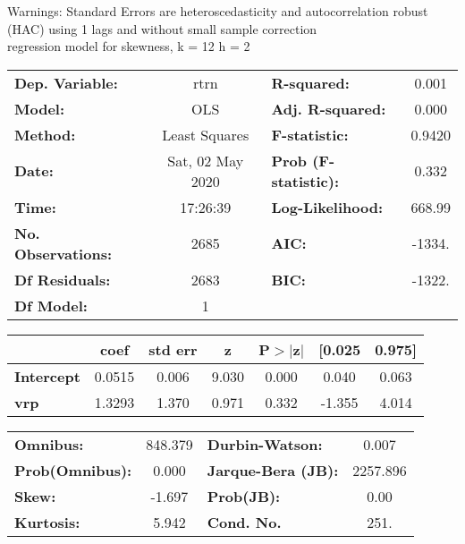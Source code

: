 Warnings: \newline
 [1] Standard Errors are heteroscedasticity and autocorrelation robust (HAC) using 1 lags and without small sample correction\\ 

regression model for skewness, k = 12 h = 2\begin{center}
\begin{tabular}{lclc}
\toprule
\textbf{Dep. Variable:}    &       rtrn       & \textbf{  R-squared:         } &     0.001   \\
\textbf{Model:}            &       OLS        & \textbf{  Adj. R-squared:    } &     0.000   \\
\textbf{Method:}           &  Least Squares   & \textbf{  F-statistic:       } &    0.9420   \\
\textbf{Date:}             & Sat, 02 May 2020 & \textbf{  Prob (F-statistic):} &    0.332    \\
\textbf{Time:}             &     17:26:39     & \textbf{  Log-Likelihood:    } &    668.99   \\
\textbf{No. Observations:} &        2685      & \textbf{  AIC:               } &    -1334.   \\
\textbf{Df Residuals:}     &        2683      & \textbf{  BIC:               } &    -1322.   \\
\textbf{Df Model:}         &           1      & \textbf{                     } &             \\
\bottomrule
\end{tabular}
\begin{tabular}{lcccccc}
                   & \textbf{coef} & \textbf{std err} & \textbf{z} & \textbf{P$> |$z$|$} & \textbf{[0.025} & \textbf{0.975]}  \\
\midrule
\textbf{Intercept} &       0.0515  &        0.006     &     9.030  &         0.000        &        0.040    &        0.063     \\
\textbf{vrp}       &       1.3293  &        1.370     &     0.971  &         0.332        &       -1.355    &        4.014     \\
\bottomrule
\end{tabular}
\begin{tabular}{lclc}
\textbf{Omnibus:}       & 848.379 & \textbf{  Durbin-Watson:     } &    0.007  \\
\textbf{Prob(Omnibus):} &   0.000 & \textbf{  Jarque-Bera (JB):  } & 2257.896  \\
\textbf{Skew:}          &  -1.697 & \textbf{  Prob(JB):          } &     0.00  \\
\textbf{Kurtosis:}      &   5.942 & \textbf{  Cond. No.          } &     251.  \\
\bottomrule
\end{tabular}
\end{center}

